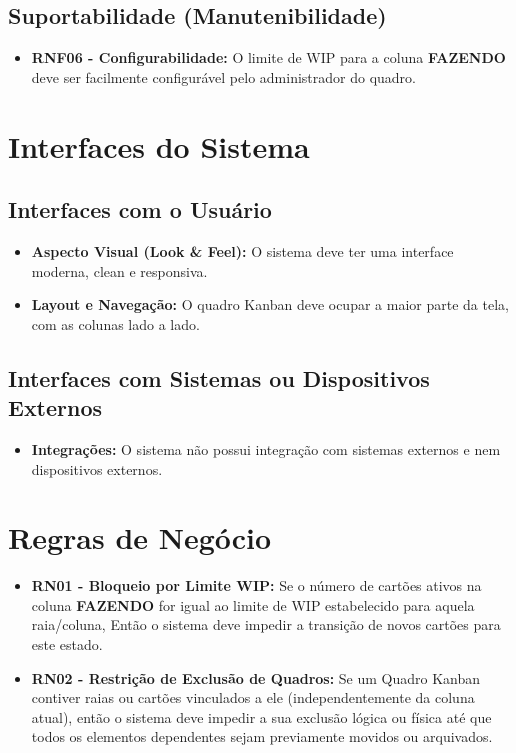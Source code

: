 \subsection{Suportabilidade (Manutenibilidade)}
\begin{itemize}
    \item \textbf{RNF06 - Configurabilidade:} O limite de WIP para a coluna 
    \textbf{FAZENDO} deve ser facilmente configurável pelo administrador do quadro.
\end{itemize}

\section{Interfaces do Sistema}
\subsection{Interfaces com o Usuário}
\begin{itemize}
    \item \textbf{Aspecto Visual (Look \& Feel):} O sistema deve ter 
    uma interface moderna, clean e responsiva.
    \item \textbf{Layout e Navegação:} O quadro Kanban deve ocupar 
    a maior parte da tela, com as colunas lado a lado.
\end{itemize}

\subsection{Interfaces com Sistemas ou Dispositivos Externos}
\begin{itemize}
    \item \textbf{Integrações:} O sistema não possui integração com 
    sistemas externos e nem dispositivos externos.
\end{itemize}

\section{Regras de Negócio}
\begin{itemize}
    \item \textbf{RN01 - Bloqueio por Limite WIP:} Se o número de cartões ativos na 
    coluna \textbf{FAZENDO} for igual ao limite de WIP estabelecido para aquela 
    raia/coluna, Então o sistema deve impedir a transição de novos cartões 
    para este estado.
    \item \textbf{RN02 - Restrição de Exclusão de Quadros:} Se um Quadro Kanban contiver 
    raias ou cartões vinculados a ele (independentemente da coluna atual), então o 
    sistema deve impedir a sua exclusão lógica ou física até que todos os 
    elementos dependentes sejam previamente movidos ou arquivados.
\end{itemize}

